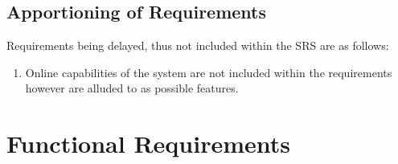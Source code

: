 \documentclass[]{article}
\begin{document}
\subsection{Apportioning of Requirements}
\label{sub:apportioning_of_requirements}
Requirements being delayed, thus not included within the SRS are as follows:
\begin{enumerate}
	\item Online capabilities of the system are not included within the requirements however are alluded to as possible features.
\end{enumerate}



\section{Functional Requirements}
\label{sec:functional_requirements}
\end{document}
